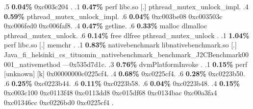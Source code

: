 \begin{profile}
{.5 \textbf{0.04\%} 0xc003c204\newline {} . 
.1 \textbf{ 0.47\%} perf             libc.so                [.] pthread\_mutex\_unlock\_impl. 
.4 \textbf{0.59\%} pthread\_mutex\_unlock\_impl. 
.6 \textbf{0.04\%} 0xc003be08\newline {} 0xc003503c\newline {} 0xc006fed0\newline {} 0xc006faf8. 
.4 \textbf{0.47\%} getline. 
.6 \textbf{0.33\%} malloc\newline {} dlmalloc\newline {} pthread\_mutex\_unlock. 
.6 \textbf{0.14\%} free\newline {} dlfree\newline {} pthread\_mutex\_unlock\newline {} . 
.1 \textbf{ 1.04\%} perf             libc.so                [.] memchr\newline {} . 
.1 \textbf{ 0.83\%} nativebenchmark  libnativebenchmark.so  [.] Java\_fi\_helsinki\_cs\_tituomin\_nativebenchmark\_benchmark\_J2CBenchmark00001\_nativemethod\newline {} ---0x535d7d1c. 
.3 \textbf{0.76\%} dvmPlatformInvoke\newline {} . 
.1 \textbf{ 0.15\%} perf             [unknown]              [k] 0x00000000c0225cf4. 
.4 \textbf{0.68\%} 0xc0225cf4. 
.6 \textbf{0.28\%} 0xc0223b50. 
.6 \textbf{0.25\%} 0xc0223b44. 
.6 \textbf{0.11\%} 0xc0223b58. 
.6 \textbf{0.04\%} 0xc0223b48. 
.4 \textbf{0.15\%} 0xc003c100\newline {} 0xc0113f48\newline {} 0xc0113dd8\newline {} 0xc015df68\newline {} 0xc0134bac\newline {} 0xc00a3fa4\newline {} 0xc01346cc\newline {} 0xc0226bd0\newline {} 0xc0225cf4\newline {} . 
}
\end{profile}
